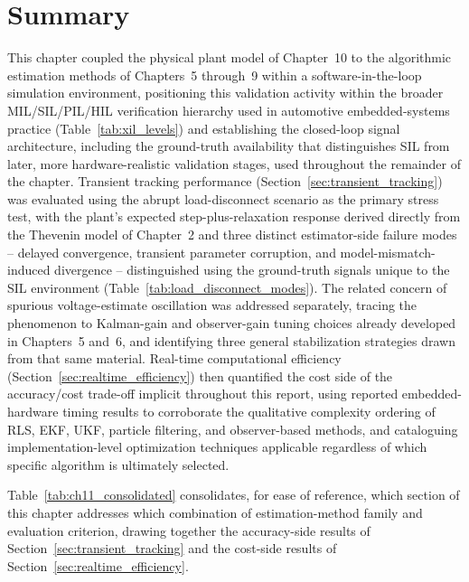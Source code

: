 \section{Summary}
\label{sec:summary_ch11}

This chapter coupled the physical plant model of Chapter~10 to the algorithmic estimation methods of Chapters~5 through~9 within a software-in-the-loop simulation environment, positioning this validation activity within the broader MIL/SIL/PIL/HIL verification hierarchy used in automotive embedded-systems practice (Table~\ref{tab:xil_levels}) and establishing the closed-loop signal architecture, including the ground-truth availability that distinguishes SIL from later, more hardware-realistic validation stages, used throughout the remainder of the chapter. Transient tracking performance (Section~\ref{sec:transient_tracking}) was evaluated using the abrupt load-disconnect scenario as the primary stress test, with the plant's expected step-plus-relaxation response derived directly from the Thevenin model of Chapter~2 and three distinct estimator-side failure modes -- delayed convergence, transient parameter corruption, and model-mismatch-induced divergence -- distinguished using the ground-truth signals unique to the SIL environment (Table~\ref{tab:load_disconnect_modes}). The related concern of spurious voltage-estimate oscillation was addressed separately, tracing the phenomenon to Kalman-gain and observer-gain tuning choices already developed in Chapters~5 and~6, and identifying three general stabilization strategies drawn from that same material. Real-time computational efficiency (Section~\ref{sec:realtime_efficiency}) then quantified the cost side of the accuracy/cost trade-off implicit throughout this report, using reported embedded-hardware timing results to corroborate the qualitative complexity ordering of RLS, EKF, UKF, particle filtering, and observer-based methods, and cataloguing implementation-level optimization techniques applicable regardless of which specific algorithm is ultimately selected.

Table~\ref{tab:ch11_consolidated} consolidates, for ease of reference, which section of this chapter addresses which combination of estimation-method family and evaluation criterion, drawing together the accuracy-side results of Section~\ref{sec:transient_tracking} and the cost-side results of Section~\ref{sec:realtime_efficiency}.

